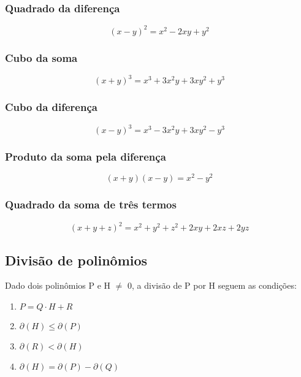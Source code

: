 \documentclass{article}
\begin{document}
\subsubsection{Quadrado da diferença}
\begin{equation*}
    (x-y)^2=x^2-2xy+y^2
\end{equation*}

\subsubsection{Cubo da soma}
\begin{equation*}
    (x+y)^3=x^3+3x^2y+3xy^2+y^3
\end{equation*}

\subsubsection{Cubo da diferença}
\begin{equation*}
    (x-y)^3=x^3-3x^2y+3xy^2-y^3
\end{equation*}

\subsubsection{Produto da soma pela diferença}
\begin{equation*}
    (x+y)(x-y)=x^2-y^2
\end{equation*}

\subsubsection{Quadrado da soma de três termos}
\begin{equation*}
    (x+y+z)^2=x^2+y^2+z^2+2xy+2xz+2yz
\end{equation*}

\subsection{Divisão de polinômios}
Dado dois polinômios P e H $\neq$ 0, a divisão de P por H seguem as condições:
\begin{enumerate}
    \item $P=Q\cdot H +R$
    \item $\partial(H)\leq \partial(P)$
    \item $\partial(R)<\partial(H)$
    \item $\partial(H)=\partial(P)-\partial(Q)$
\end{enumerate}
\end{document}
